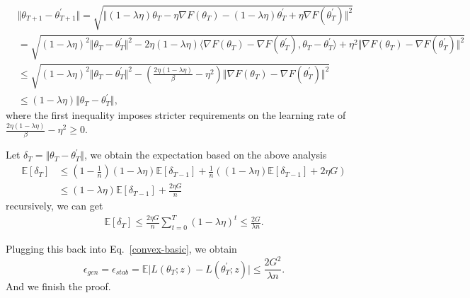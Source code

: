 \begin{equation}\label{eq:app2.3}
     \begin{aligned}
      &\Vert \theta_{T+1} - \theta_{T+1}^{\prime}\Vert = \sqrt{\Vert (1-\lambda\eta)\theta_{T} - \eta \nabla F(\theta_{T}) - (1-\lambda\eta)\theta_{T}^{\prime} + \eta \nabla F(\theta_{T}^{\prime})\Vert^2}  \\
      &=\!\sqrt{\!(1-\lambda\eta)^2\Vert \theta_{T} \!-\! \theta_{T}^{\prime} \Vert^2 \!-\! 2\eta (1\!-\!\lambda\eta)\langle \nabla F(\theta_{T}) \!-\!\nabla F(\theta_{T}^{\prime}), \theta_T \!-\! \theta_T^{\prime} \rangle \!+\!\eta^2 \Vert \nabla F(\theta_{T}) \!-\! \nabla F(\theta_{T}^{\prime})\Vert^2} \\
      &\leq \sqrt{(1-\lambda\eta)^2\Vert \theta_T- \theta_T^{\prime}\Vert^2 - \left(\frac{2\eta (1-\lambda\eta)}{\beta} -\eta^2 \right) \Vert \nabla F(\theta_{T}) -\nabla F(\theta_{T}^{\prime})\Vert^2} \\
      &\leq (1-\lambda\eta)\Vert \theta_T- \theta_T^{\prime}\Vert,
     \end{aligned}
\end{equation}
where the first inequality imposes stricter requirements on the learning rate of $\frac{2\eta (1-\lambda\eta)}{\beta} -\eta^2 \geq 0$.

Let $\delta_{T}=\Vert\theta_T- \theta_T^{\prime}\Vert$, we obtain the expectation based on the above analysis 
  \begin{equation}
  \begin{aligned}
    \mathbb{E}\left[\delta_{T}\right] &\leq (1-\frac{1}{n})(1-\lambda \eta)\mathbb{E}\left[\delta_{T-1}\right] + \frac{1}{n}\left((1-\lambda \eta)\mathbb{E}\left[\delta_{T-1}\right] + 2\eta G\right)\\
    &\leq (1-\lambda \eta)\mathbb{E}\left[\delta_{T-1}\right] + \frac{2\eta G}{n}
  \end{aligned}
 \end{equation}
recursively, we can get 
    \begin{equation}
     \begin{aligned}
      \mathbb{E}\left[\delta_{T}\right] \leq \frac{2\eta G}{n} \sum_{t=0}^{T}(1-\lambda \eta)^t \leq \frac{2G}{\lambda n}.
     \end{aligned}
    \end{equation}

Plugging this back into Eq.~\eqref{convex-basic}, we obtain
 \begin{equation}\label{eq:2.2.1}
  \epsilon_{gen} = \epsilon_{stab} = \mathbb{E}\vert L(\theta_T;z) - L(\theta^{\prime}_T;z)\vert \leq \frac{2G^2}{\lambda n}.
 \end{equation}
And we finish the proof.

